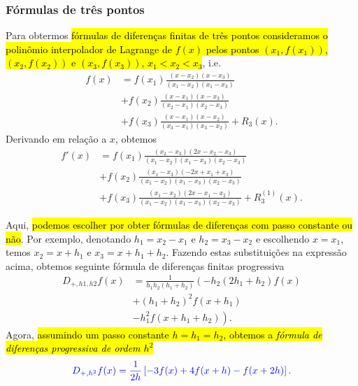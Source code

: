\subsubsection{Fórmulas de três pontos}

Para obtermos \hl{fórmulas de diferenças finitas de três pontos consideramos o polinômio interpolador de Lagrange de $f(x)$ pelos pontos $(x_1, f(x_1))$, $(x_2, f(x_2))$ e $(x_3, f(x_3))$, $x_1<x_2<x_3$}, i.e.
\begin{align}
  f(x) &= f(x_1)\frac{(x-x_2)(x-x_3)}{(x_1-x_2)(x_1-x_3)} \\
  &+ f(x_2)\frac{(x-x_1)(x-x_3)}{(x_2-x_1)(x_2-x_3)} \\
  &+ f(x_3)\frac{(x-x_1)(x-x_2)}{(x_3-x_1)(x_3-x_2)} + R_3(x).
\end{align}
Derivando em relação a $x$, obtemos
\begin{align}\label{eq:aux_deriv1}
  f'(x) &= f{\left (x_{1} \right )}\frac{\left(x_{2} - x_{3}\right) \left(2 x- x_{2} - x_{3}\right)}{\left(x_{1} - x_{2}\right) \left(x_{1} - x_{3}\right) \left(x_{2} - x_{3}\right)} \\
  &+ f{\left (x_{2} \right )}\frac{\left(x_{1} - x_{3}\right) \left(- 2 x + x_{1} + x_{3}\right)}{\left(x_{1} - x_{2}\right) \left(x_{1} - x_{3}\right) \left(x_{2} - x_{3}\right)}\\
  &+ f\left(x_{3} \right)\frac{\left(x_{1} - x_{2}\right)\left(2 x - x_{1} - x_{2}\right)}{\left(x_{1} - x_{2}\right) \left(x_{1} - x_{3}\right) \left(x_{2} - x_{3}\right)} + R_3^{(1)}(x).
\end{align}

Aqui, \hl{podemos escolher por obter fórmulas de diferenças com passo constante ou não}. Por exemplo, denotando $h_1=x_2-x_1$ e $h_2=x_3-x_2$ e escolhendo $x=x_1$, temos $x_2 = x+h_1$ e $x_3 = x+h_1+h_2$. Fazendo estas substituições na expressão acima, obtemos seguinte fórmula de diferenças finitas progressiva
\begin{align}
  D_{+,h1,h2}f(x) &= \frac{1}{h_{1} h_{2} \left(h_{1} + h_{2}\right)} \left(- h_{2} \left(2 h_{1} + h_{2}\right) f{\left (x \right )} \right.\\
    &+ \left. \left(h_{1} + h_{2}\right)^{2} f{\left (x + h_{1} \right )} \right.\\
    &- \left. h_{1}^{2} f{\left (x + h_{1} + h_{2} \right )} \right).
\end{align}
Agora, \hl{assumindo um passo constante $h=h_1=h_2$, obtemos a \emph{fórmula de diferenças progressiva de ordem $h^2$}}
\begin{equation}\color{blue}D_{+,h^2}f(x) = \frac{1}{2 h} \left[- 3 f{\left (x \right )} + 4 f{\left (x + h \right )} - f{\left (x + 2 h \right )}\right].\label{eq:dfp_3pts}
\end{equation}

